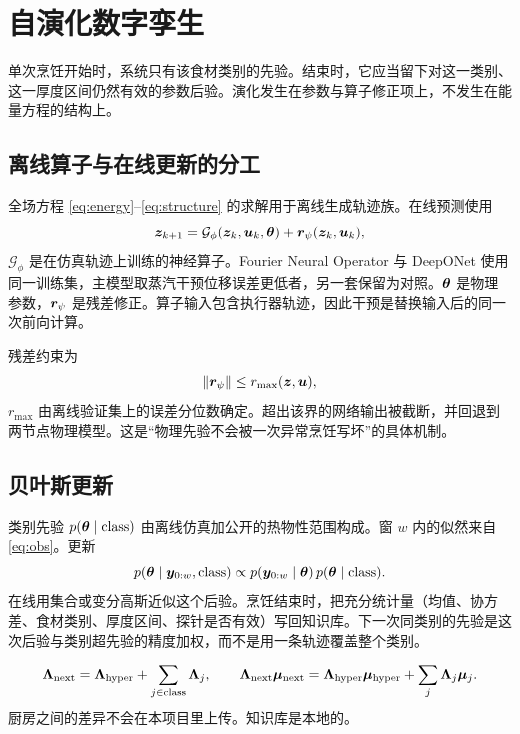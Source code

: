 \chapter{自演化数字孪生}
\label{ch:evolve}

单次烹饪开始时，系统只有该食材类别的先验。结束时，它应当留下对这一类别、这一厚度区间仍然有效的参数后验。演化发生在参数与算子修正项上，不发生在能量方程的结构上。

\section{离线算子与在线更新的分工}

全场方程 \eqref{eq:energy}--\eqref{eq:structure} 的求解用于离线生成轨迹族。在线预测使用
\begin{equation}
\label{eq:op}
\bm{z}_{k+1}=\mathcal{G}_{\phi}(\bm{z}_k,\bm{u}_k,\bm{\theta})+\bm{r}_{\psi}(\bm{z}_k,\bm{u}_k),
\end{equation}
$\mathcal{G}_{\phi}$ 是在仿真轨迹上训练的神经算子。Fourier Neural Operator 与 DeepONet 使用同一训练集，主模型取蒸汽干预位移误差更低者，另一套保留为对照。$\bm{\theta}$ 是物理参数，$\bm{r}_{\psi}$ 是残差修正。算子输入包含执行器轨迹，因此干预是替换输入后的同一次前向计算。

残差约束为
\begin{equation}
\label{eq:bnp}
\|\bm{r}_{\psi}\|\le r_{\max}(\bm{z},\bm{u}),
\end{equation}
$r_{\max}$ 由离线验证集上的误差分位数确定。超出该界的网络输出被截断，并回退到两节点物理模型。这是“物理先验不会被一次异常烹饪写坏”的具体机制。

\section{贝叶斯更新}

类别先验 $p(\bm{\theta}\mid\mathrm{class})$ 由离线仿真加公开的热物性范围构成。窗 $w$ 内的似然来自 \eqref{eq:obs}。更新
\begin{equation}
\label{eq:bayes}
p(\bm{\theta}\mid\bm{y}_{0:w},\mathrm{class})
\propto p(\bm{y}_{0:w}\mid\bm{\theta})\,p(\bm{\theta}\mid\mathrm{class}).
\end{equation}
在线用集合或变分高斯近似这个后验。烹饪结束时，把充分统计量（均值、协方差、食材类别、厚度区间、探针是否有效）写回知识库。下一次同类别的先验是这次后验与类别超先验的精度加权，而不是用一条轨迹覆盖整个类别。

\begin{equation}
\label{eq:hier}
\bm{\Lambda}_{\mathrm{next}}=\bm{\Lambda}_{\mathrm{hyper}}+\sum_{j\in\mathrm{class}}\bm{\Lambda}_{j},
\qquad
\bm{\Lambda}_{\mathrm{next}}\bm{\mu}_{\mathrm{next}}
=\bm{\Lambda}_{\mathrm{hyper}}\bm{\mu}_{\mathrm{hyper}}+\sum_{j}\bm{\Lambda}_{j}\bm{\mu}_{j}.
\end{equation}
厨房之间的差异不会在本项目里上传。知识库是本地的。

